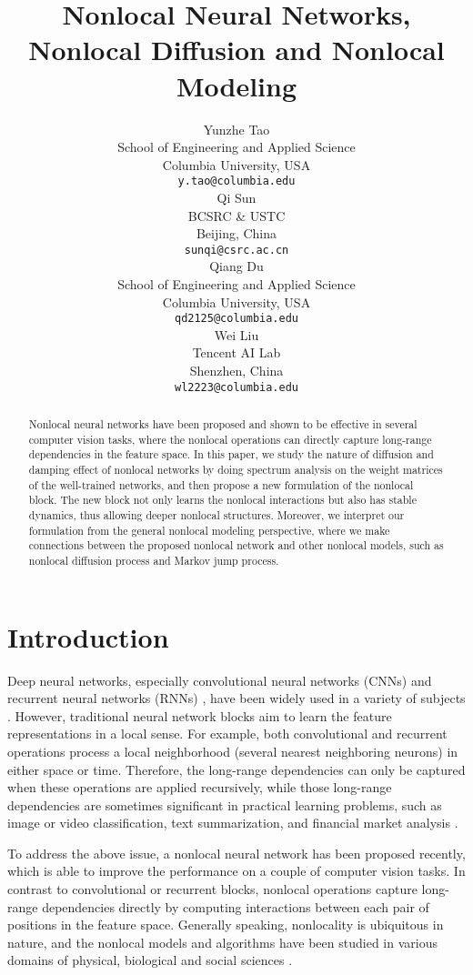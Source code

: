 \documentclass{article}
\title{Nonlocal Neural Networks, Nonlocal Diffusion and Nonlocal Modeling}
\author{
  Yunzhe Tao \\
  School of Engineering and Applied Science\\
  Columbia University, USA\\
  \texttt{y.tao@columbia.edu} \\
   \And
   Qi Sun \\
  BCSRC \& USTC \\
  Beijing, China \\
   \texttt{sunqi@csrc.ac.cn} \\
   \AND
   Qiang Du \\
  School of Engineering and Applied Science\\
  Columbia University, USA\\
   \texttt{qd2125@columbia.edu} \\
   \And
   Wei Liu \\
   Tencent AI Lab \\
   Shenzhen, China \\
   \texttt{wl2223@columbia.edu} \\
}
\begin{document}
\maketitle

\begin{abstract}
Nonlocal neural networks \cite{wang2017non} have been proposed and shown to be effective in several computer vision tasks, where the nonlocal operations can directly capture long-range dependencies in the feature space. In this paper, we study the nature of diffusion and damping effect of nonlocal networks by doing spectrum analysis on the weight matrices of the well-trained networks, and then propose a new formulation of the nonlocal block. The new block not only learns the nonlocal interactions but also has stable dynamics, thus allowing deeper nonlocal structures. Moreover, we interpret our formulation from the general nonlocal modeling perspective, where we make connections between the proposed nonlocal network and other nonlocal models, such as nonlocal diffusion process and Markov jump process.
\end{abstract}

\section{Introduction}\label{sec:intro}
Deep neural networks, especially convolutional neural networks (CNNs) \cite{lecun1995convolutional} and recurrent neural networks (RNNs) \cite{elman1991distributed}, have been widely used in a variety of subjects \cite{lecun2015deep}. However, traditional neural network blocks aim to learn the feature representations in a local sense. For example, both convolutional and recurrent operations process a local neighborhood (several nearest neighboring neurons) in either space or time. Therefore, the long-range dependencies can only be captured when these operations are applied recursively, while those long-range dependencies are sometimes significant in practical learning problems, such as image or video classification, text summarization, and financial market analysis \cite{beran1995long,cont2005long,pipiras2017long,willinger2003long}.

To address the above issue, a nonlocal neural network \cite{wang2017non} has been proposed recently, which is able to improve the performance on a couple of computer vision tasks. In contrast to convolutional or recurrent blocks, nonlocal operations \cite{wang2017non} capture long-range dependencies directly by computing interactions between each pair of positions in the feature space. Generally speaking, nonlocality is ubiquitous in nature, and the nonlocal models and algorithms have been studied in various domains of physical, biological and social sciences \cite{ buades2005non, coifman2006diffusion, du2012analysis,silling2000reformulation,tadmor2015mathematical}.
\end{document}
